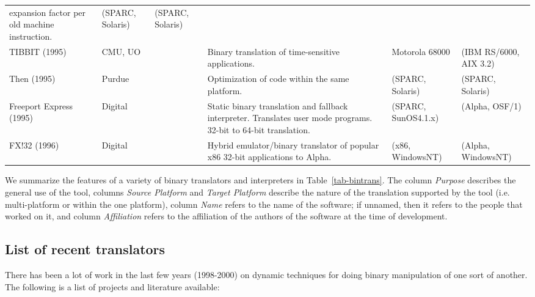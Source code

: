 \begin{table*}[hbtp]
{\begin{tabular}{|p{1.5cm}|p{1.3cm}|p{0.7cm}|p{5cm}|p{2cm}|p{2cm}|}
	expansion factor per old machine instruction. &
	(SPARC, Solaris) &
	(SPARC, Solaris) \\
TIBBIT (1995) & CMU, UO & \cite{Cogs95,Cogs95b} &
	Binary translation of time-sensitive applications.&
	Motorola 68000 &
	(IBM RS/6000, AIX 3.2) \\
Then (1995) & Purdue & \cite{Then95} &
	Optimization of code within the same platform.&
	(SPARC, Solaris) &
	(SPARC, Solaris) \\
Freeport Express (1995) & Digital & \cite{Dec95} &
	Static binary translation and fallback interpreter.  Translates
	user mode programs. 32-bit to 64-bit translation. &
	(SPARC, SunOS4.1.x) &
	(Alpha, OSF/1) \\
FX!32 (1996) & Digital & \cite{Thom96,Hook97} &
	Hybrid emulator/binary translator of popular x86 32-bit applications 
	to Alpha.   &
	(x86, WindowsNT) &
	(Alpha, WindowsNT) \\
\hline
\end{tabular}
\caption{\label{tab-bintrans} {Summary of Binary Translators and
	Interpreters in Cronological Order.}}}
\end{table*}

We summarize the features of a variety of binary translators and
interpreters in Table~\ref{tab-bintrans}.  The column {\em Purpose\/} 
describes the general use of the tool, columns {\em Source Platform\/}
and {\em Target Platform\/} describe the nature of the translation supported
by the tool (i.e. multi-platform or within the one platform), 
column {\em Name\/} refers to the name of the software; if unnamed, then
it refers to the people that worked on it, and column {\it Affiliation}
refers to the affiliation of the authors of the software at the time
of development. 


\subsection{List of recent translators}
There has been a lot of work in the last few years (1998-2000) 
on dynamic techniques for doing binary manipulation of one sort of 
another.  The following is a list of projects and literature available: 

